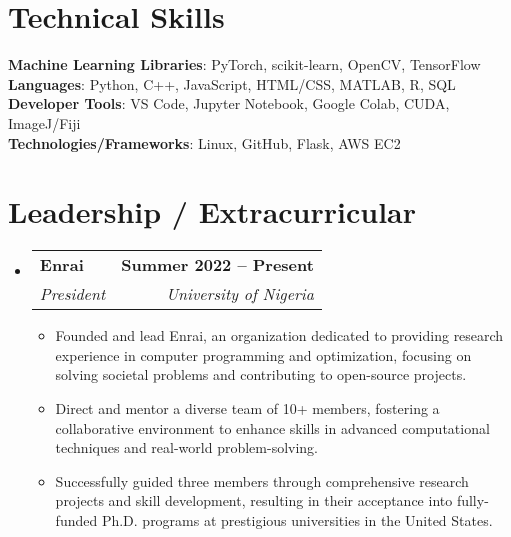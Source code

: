 \documentclass[letterpaper,11pt]{article}
\makeatletter
\newcommand{\resumeItem}[1]{
  \item\small{
    {#1 \vspace{-2pt}}
  }
}
\newcommand{\resumeSubheading}[4]{
  \vspace{-2pt}\item
    \begin{tabular*}{1.0\textwidth}[t]{l@{\extracolsep{\fill}}r}
      \textbf{#1} & \textbf{\small #2} \\
      \textit{\small#3} & \textit{\small #4} \\
    \end{tabular*}\vspace{-7pt}
}
\newcommand{\resumeSubHeadingListStart}{\begin{itemize}[leftmargin=0.0in, label={}]}
\newcommand{\resumeSubHeadingListEnd}{\end{itemize}}
\newcommand{\resumeItemListStart}{\begin{itemize}}
\newcommand{\resumeItemListEnd}{\end{itemize}\vspace{-5pt}}
\makeatother
\begin{document}
\section{Technical Skills}
 \begin{itemize}[leftmargin=0.15in, label={}]
    \small{\item{
     \textbf{Machine Learning Libraries}{: PyTorch, scikit-learn, OpenCV, TensorFlow} \\
     \textbf{Languages}{: Python, C++, JavaScript, HTML/CSS, MATLAB, R, SQL} \\
     \textbf{Developer Tools}{: VS Code, Jupyter Notebook, Google Colab, CUDA, ImageJ/Fiji} \\
     \textbf{Technologies/Frameworks}{: Linux, GitHub, Flask, AWS EC2} \\
    }}
 \end{itemize}
 \vspace{-16pt}


\section{Leadership / Extracurricular}
    \resumeSubHeadingListStart
        \resumeSubheading{Enrai}{Summer 2022 -- Present}{President}{University of Nigeria}
            \resumeItemListStart
                \resumeItem{Founded and lead Enrai, an organization dedicated to providing research experience in computer programming and optimization, focusing on solving societal problems and contributing to open-source projects.}
                \resumeItem{Direct and mentor a diverse team of 10+ members, fostering a collaborative environment to enhance skills in advanced computational techniques and real-world problem-solving.}
                \resumeItem{Successfully guided three members through comprehensive research projects and skill development, resulting in their acceptance into fully-funded Ph.D. programs at prestigious universities in the United States.}
            \resumeItemListEnd
        
    \resumeSubHeadingListEnd
\end{document}
